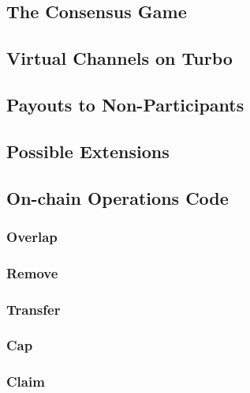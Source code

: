 \documentclass{article}
\theoremstyle{definition}
\begin{document}
\subsection{The Consensus Game}
\subsection{Virtual Channels on Turbo}
\subsection{Payouts to Non-Participants}
\subsection{Possible Extensions}

\subsection{On-chain Operations Code}
\subsubsection{Overlap}
\begin{minipage}{\linewidth} %
  
\end{minipage}

\subsubsection{Remove}
\begin{minipage}{\linewidth} %
  
\end{minipage}

\subsubsection{Transfer}
\begin{minipage}{\linewidth} %
  
\end{minipage}

\subsubsection{Cap}\label{appendix:cap}
\begin{minipage}{\linewidth} %
  
\end{minipage}

\subsubsection{Claim}\label{appendix:claim}
\begin{minipage}{\linewidth} %
  
\end{minipage}
\end{document}
